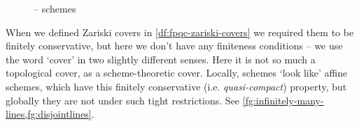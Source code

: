         \begin{figure}[h]
            \centering
            \caption{ -- schemes}
            \label{fg:scheme}
        \end{figure}

        When we defined Zariski covers in \cref{df:fpqc-zariski-covers} we required them to be finitely conservative, but here we don't have any finiteness conditions -- we use the word `cover' in two slightly different senses.
        Here it is not so much a topological cover, as a scheme-theoretic cover.
        Locally, schemes `look like' affine schemes, which have this finitely conservative (i.e. \emph{quasi-compact}) property, but globally they are not under such tight restrictions.
        See \cref{fg:infinitely-many-lines,fg:disjointlines}.

